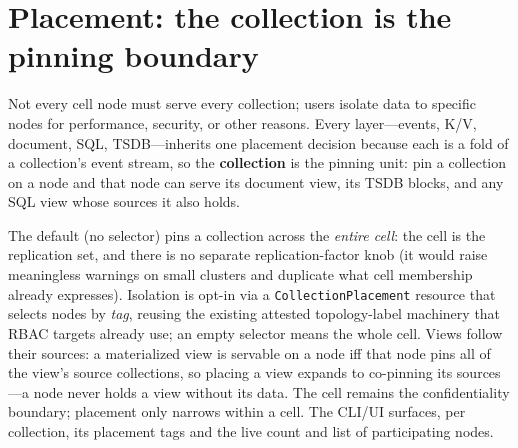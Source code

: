 \documentclass[10pt,twocolumn]{article}
\newcommand{\code}[1]{\texttt{\small #1}}
\begin{document}
\section{Placement: the collection is the pinning boundary}
Not every cell node must serve every collection; users isolate data to specific nodes
for performance, security, or other reasons. Every layer---events, K/V, document, SQL,
TSDB---inherits one placement decision because each is a fold of a collection's event
stream, so the \textbf{collection} is the pinning unit: pin a collection on a node and
that node can serve its document view, its TSDB blocks, and any SQL view whose sources
it also holds.

The default (no selector) pins a collection across the \emph{entire cell}: the cell is
the replication set, and there is no separate replication-factor knob (it would raise
meaningless warnings on small clusters and duplicate what cell membership already
expresses). Isolation is opt-in via a \code{CollectionPlacement} resource that selects
nodes by \emph{tag}, reusing the existing attested topology-label machinery that RBAC
targets already use; an empty selector means the whole cell. Views follow their
sources: a materialized view is servable on a node iff that node pins all of the
view's source collections, so placing a view expands to co-pinning its sources---a
node never holds a view without its data. The cell remains the confidentiality
boundary; placement only narrows within a cell. The CLI/UI surfaces, per collection,
its placement tags and the live count and list of participating nodes.
\end{document}
